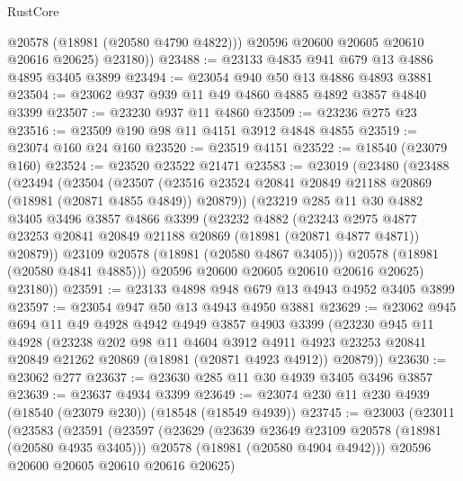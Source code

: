 \begin{lexlean}{RustCore}
\begin{coremodule}
            @20578
            (@18981 (@20580 @4790 @4822)))
          @20596
          @20600
          @20605
          @20610
          @20616
          @20625)
        @23180))
@23488 := @23133 @4835 @941 @679 @13 @4886 @4895 @3405 @3899
@23494 := @23054 @940 @50 @13 @4886 @4893 @3881
@23504 := @23062 @937 @939 @11 @49 @4860 @4885 @4892 @3857 @4840 @3399
@23507 := @23230 @937 @11 @4860
@23509 := @23236 @275 @23
@23516 := @23509 @190 @98 @11 @4151 @3912 @4848 @4855
@23519 := @23074 @160 @24 @160
@23520 := @23519 @4151
@23522 := @18540 (@23079 @160)
@23524 := @23520 @23522 @21471
@23583 := @23019
    (@23480
      (@23488
        (@23494
          (@23504
            (@23507
              (@23516 @23524 @20841 @20849 @21188 @20869 (@18981 (@20871 @4855 @4849)) @20879))
            (@23219
              @285
              @11
              @30
              @4882
              @3405
              @3496
              @3857
              @4866
              @3399
              (@23232
                @4882
                (@23243
                  @2975
                  @4877
                  @23253
                  @20841
                  @20849
                  @21188
                  @20869
                  (@18981 (@20871 @4877 @4871))
                  @20879))
              @23109
              @20578
              (@18981 (@20580 @4867 @3405)))
            @20578
            (@18981 (@20580 @4841 @4885)))
          @20596
          @20600
          @20605
          @20610
          @20616
          @20625)
        @23180))
@23591 := @23133 @4898 @948 @679 @13 @4943 @4952 @3405 @3899
@23597 := @23054 @947 @50 @13 @4943 @4950 @3881
@23629 := @23062
    @945
    @694
    @11
    @49
    @4928
    @4942
    @4949
    @3857
    @4903
    @3399
    (@23230
      @945
      @11
      @4928
      (@23238
        @202
        @98
        @11
        @4604
        @3912
        @4911
        @4923
        @23253
        @20841
        @20849
        @21262
        @20869
        (@18981 (@20871 @4923 @4912))
        @20879))
@23630 := @23062 @277
@23637 := @23630 @285 @11 @30 @4939 @3405 @3496 @3857
@23639 := @23637 @4934 @3399
@23649 := @23074 @230 @11 @230 @4939 (@18540 (@23079 @230)) (@18548 (@18549 @4939))
@23745 := @23003
    (@23011
      (@23583
        (@23591
          (@23597
            (@23629
              (@23639 @23649 @23109 @20578 (@18981 (@20580 @4935 @3405)))
              @20578
              (@18981 (@20580 @4904 @4942)))
            @20596
            @20600
            @20605
            @20610
            @20616
            @20625)

\end{coremodule}
\end{lexlean}
